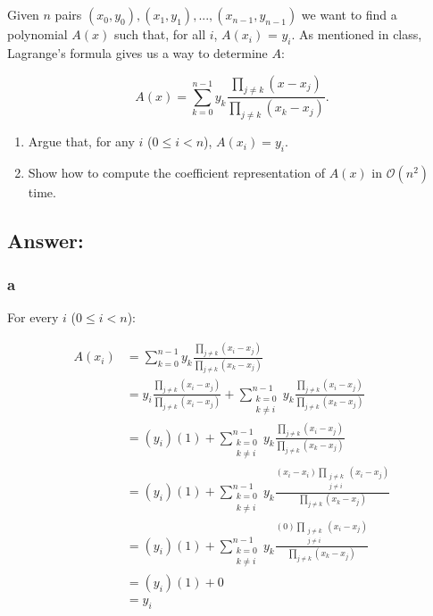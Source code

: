 \documentclass[12pt, letterpaper]{article}
\title{\ptitle{}}
\author{\pauthor{}}
\begin{document}
\maketitle

\section{}
Given $n$ pairs $(x_0, y_0), (x_1, y_ 1), ..., (x_{n-1}, y_{n-1})$ we want to find a polynomial $A(x)$ such that,
for all $i$, $A(x_i)$ = $y_i$. As mentioned in class, Lagrange's formula gives us a way to determine $A$:

\begin{equation*}
    A(x) = \sum_{k=0}^{n-1}{y_k\frac{ \prod_{j \neq k}{(x - x_j)} }{ \prod_{j \neq k}{(x_k - x_j)} }} .
\end{equation*}

\renewcommand{\theenumi}{\alph{enumi}}
\begin{enumerate}
    \item Argue that, for any $i$ ($0 \leq i < n$), $A(x_i) = y_i$.
    \item Show how to compute the coefficient representation of $A(x)$ in $\mathcal{O}(n^2)$ time.
\end{enumerate}
\renewcommand{\theenumi}{\arabic{enumi}}

\clearpage
\subsection*{Answer:}
\subsubsection*{a}
For every $i$ ($0 \leq i < n$):

\begin{align*}
    A(x_i) &= \sum_{k=0}^{n-1}{y_k\frac{ \prod_{j \neq k}{(x_i - x_j)} }{ \prod_{j \neq k}{(x_k - x_j)} }} \\
    &= y_i\frac{ \prod_{j \neq k}{(x_i - x_j)} }{ \prod_{j \neq k}{(x_i - x_j)} } + \sum_{\substack{k=0\\k\neq i}}^{n-1}{y_k\frac{ \prod_{j \neq k}{(x_i - x_j)} }{ \prod_{j \neq k}{(x_k - x_j)} }}\\
    &= (y_i)(1) + \sum_{\substack{k=0\\k\neq i}}^{n-1}{y_k\frac{ \prod_{j \neq k}{(x_i - x_j)} }{ \prod_{j \neq k}{(x_k - x_j)} }}\\
    &= (y_i)(1) + \sum_{\substack{k=0\\k\neq i}}^{n-1}{y_k\frac{ (x_i - x_i)\prod_{\substack{j \neq k\\j \neq i}}{(x_i - x_j)} }{ \prod_{j \neq k}{(x_k - x_j)} }}\\
    &= (y_i)(1) + \sum_{\substack{k=0\\k\neq i}}^{n-1}{y_k\frac{ (0)\prod_{\substack{j \neq k\\j \neq i}}{(x_i - x_j)} }{ \prod_{j \neq k}{(x_k - x_j)} }}\\
    &= (y_i)(1) + 0\\
    &= y_i\\
\end{align*}
\end{document}
